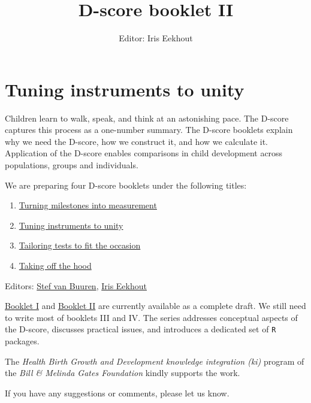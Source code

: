 \documentclass[
]{book}
\title{D-score booklet II}
\author{Editor: Iris Eekhout}
\date{}
\providecommand{\tightlist}{%
  \setlength{\itemsep}{0pt}\setlength{\parskip}{0pt}}
\begin{document}
\maketitle

{
\setcounter{tocdepth}{1}
\tableofcontents
}
\hypertarget{tuning-instruments-to-unity}{%
\chapter*{Tuning instruments to unity}\label{tuning-instruments-to-unity}}

Children learn to walk, speak, and think at an astonishing pace. The D-score captures this process as a one-number summary. The D-score booklets explain why we need the D-score, how we construct it, and how we calculate it. Application of the D-score enables comparisons in child development across populations, groups and individuals.

We are preparing four D-score booklets under the following titles:

\begin{enumerate}
\def\labelenumi{\Roman{enumi}.}
\tightlist
\item
  \href{https://d-score.org/dbook1}{Turning milestones into measurement}
\item
  \href{https://d-score.org/dbook2}{Tuning instruments to unity}
\item
  \href{https://stefvanbuuren.name/dbook3}{Tailoring tests to fit the occasion}
\item
  \href{https://stefvanbuuren.name/dbook4}{Taking off the hood}
\end{enumerate}

Editors: \href{https://stefvanbuuren.name}{Stef van Buuren}, \href{https://www.iriseekhout.com}{Iris Eekhout}

\href{https://d-score.org/dbook1}{Booklet I} and \href{https://d-score.org/dbook2}{Booklet II} are currently available as a complete draft. We still need to write most of booklets III and IV. The series addresses conceptual aspects of the D-score, discusses practical issues, and introduces a dedicated set of \texttt{R} packages.

The \emph{Health Birth Growth and Development knowledge integration (ki)} program of the \emph{Bill \& Melinda Gates Foundation} kindly supports the work.

If you have any suggestions or comments, please let us know.
\end{document}
